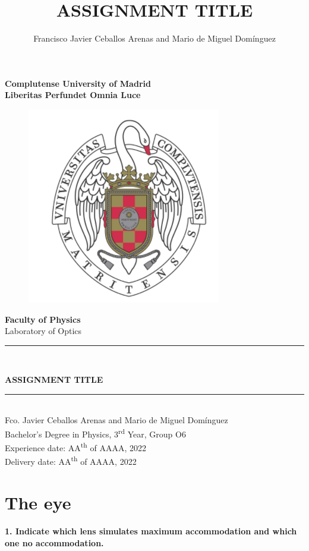 \documentclass[a4paper, 12pt]{article}
\author{Francisco Javier Ceballos Arenas and Mario de Miguel Domínguez}
\title{ASSIGNMENT TITLE}
\begin{document}
	
	\begin{titlepage}
		\begin{center}
			{\huge \textbf{Complutense University of Madrid}}\\
			\vspace{3mm}
			{\large \textbf{Liberitas Perfundet Omnia Luce}}\\
			\vspace{1cm}
			\begin{figure}[h]
				\centering
				\includegraphics[scale=1.10]{figs/ucmlogo.png}
			\end{figure}
			\vspace{5mm}
			{\LARGE \textbf{Faculty of Physics}}\\
			\vspace{3.5mm}
			{\Large Laboratory of Optics}\\
			\vfill
			\textcolor{azul}{\rule{\linewidth}{0.75mm}}\\
			\vspace{2mm}
			\begin{spacing}{1.5}
				{\LARGE \textbf{ASSIGNMENT TITLE}}\\
			\end{spacing}
			\textcolor{azul}{\rule{\linewidth}{0.75mm}}\\
			\vspace{7pt}
			\vfill
			\LARGE{Fco. Javier Ceballos Arenas and Mario de Miguel Domínguez\\}
			\vfill
			\Large{Bachelor's Degree in Physics, 3\textsuperscript{rd} Year, Group O6\\ Experience date: AA\textsuperscript{th} of AAAA, 2022\\ Delivery date: AA\textsuperscript{th} of AAAA, 2022}
			\vfill
		\end{center}
	\end{titlepage}
	\thispagestyle{empty}
	\addtocounter{page}{-1}
	\tableofcontents
	\newpage
	
	\section{The eye}
	
	\textbf{1. Indicate which lens simulates maximum accommodation and which one no accommodation.} \\
\end{document}
